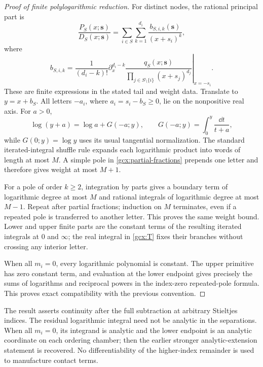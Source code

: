 \begin{proof}[Proof of finite polylogarithmic reduction]
For distinct nodes, the rational principal part is
\begin{equation}\label{gcx:partial-fractions}
 \frac{P_S(x;\boldsymbol s)}{D_S(x;\boldsymbol s)}
  =\sum_{i\in S}\sum_{k=1}^{d_i}
       \frac{b_{S,i,k}(\boldsymbol s)}{(x+s_i)^k},
\end{equation}
where
\begin{equation}\label{gcx:b-coefficient}
 b_{S,i,k}=\frac1{(d_i-k)!}
 \left.\partial_x^{d_i-k}
 \frac{q_S(x;\boldsymbol s)}
      {\prod_{j\in S\setminus\{i\}}(x+s_j)^{d_j}}
 \right|_{x=-s_i}.
\end{equation}
These are finite expressions in the stated tail and weight data.
Translate to $y=x+b_S$.  All letters $-a_i$, where
$a_i=s_i-b_S\ge0$, lie on the nonpositive real axis.  For $a>0$,
\[
 \log(y+a)=\log a+G(-a;y),\qquad
 G(-a;y)=\int_0^y\frac{\dd t}{t+a},
\]
while $G(0;y)=\log y$ uses its usual tangential normalization.
The standard iterated-integral shuffle rule \cite{goncharov} expands each logarithmic product into words of
length at most $M$.  A simple pole in \eqref{gcx:partial-fractions}
prepends one letter and therefore gives weight at most $M+1$.

For a pole of order $k\ge2$, integration by parts gives a boundary term
of logarithmic degree at most $M$ and rational integrals of logarithmic
degree at most $M-1$.  Repeat after partial fractions; induction on $M$
terminates, even if a repeated pole is transferred to another letter.
This proves the same weight bound.  Lower and upper finite parts are the
constant terms of the resulting iterated integrals at $0$ and $\infty$;
the real integral in \eqref{gcx:T} fixes their branches without crossing
any interior letter.

When all $m_i=0$, every logarithmic polynomial is constant.  The upper
primitive has zero constant term, and evaluation at the lower endpoint
gives precisely the sums of logarithms and reciprocal powers in the
index-zero repeated-pole formula.  This proves exact compatibility with
the previous convention.
\end{proof}

\begin{remark}\label{gcx:regularity}
The result asserts continuity after the full subtraction at arbitrary
Stieltjes indices.  The residual logarithmic integral need not be
analytic in the separations.  When all $m_i=0$, its integrand is analytic
and the lower endpoint is an analytic coordinate on each ordering
chamber; then the earlier stronger analytic-extension statement is
recovered.  No differentiability of the higher-index remainder is used
to manufacture contact terms.
\end{remark}
